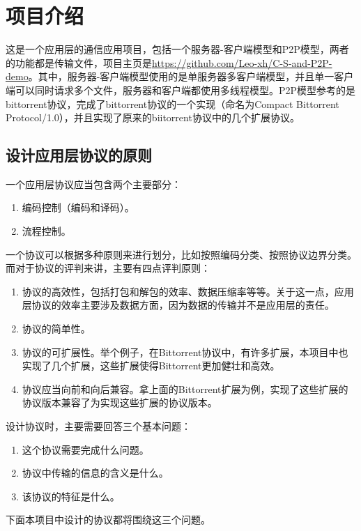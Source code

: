 \documentclass[15pt]{ctexart}
\begin{document}

\tableofcontents
\newpage
\section{项目介绍} %
\label{sec:项目介绍}
\par 这是一个应用层的通信应用项目，包括一个服务器-客户端模型和P2P模型，两者的功能都是传输文件，项目主页是\url{https://github.com/Leo-xh/C-S-and-P2P-demo}。其中，服务器-客户端模型使用的是单服务器多客户端模型，并且单一客户端可以同时请求多个文件，服务器和客户端都使用多线程模型。P2P模型参考的是bittorrent协议，完成了bittorrent协议的一个实现（命名为Compact Bittorrent Protocol/1.0），并且实现了原来的biitorrent协议中的几个扩展协议。
	\subsection{设计应用层协议的原则} %
	\label{sub:设计应用层协议的原则}
		一个应用层协议应当包含两个主要部分：
		\begin{enumerate}
			\item 编码控制（编码和译码）。
			\item 流程控制。
		\end{enumerate}
		\par 一个协议可以根据多种原则来进行划分，比如按照编码分类、按照协议边界分类。而对于协议的评判来讲，主要有四点评判原则：
		\begin{enumerate}
			\item 协议的高效性，包括打包和解包的效率、数据压缩率等等。关于这一点，应用层协议的效率主要涉及数据方面，因为数据的传输并不是应用层的责任。
			\item 协议的简单性。
			\item 协议的可扩展性。举个例子，在Bittorrent协议中，有许多扩展，本项目中也实现了几个扩展，这些扩展使得Bittorrent更加健壮和高效。
			\item 协议应当向前和向后兼容。拿上面的Bittorrent扩展为例，实现了这些扩展的协议版本兼容了为实现这些扩展的协议版本。
		\end{enumerate}
		\par 设计协议时，主要需要回答三个基本问题：
		\begin{enumerate}
			\item 这个协议需要完成什么问题。
			\item 协议中传输的信息的含义是什么。
			\item 该协议的特征是什么。
		\end{enumerate}
		下面本项目中设计的协议都将围绕这三个问题。
\end{document}
